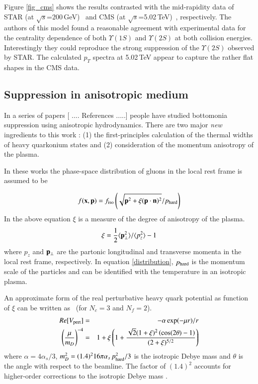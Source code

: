 {{Figure \ref{fig_cms} shows the results contrasted with the mid-rapidity data of STAR (at
$\sqrt{s}$=200\,GeV)~\cite{Ye:2017qmstar} and CMS
(at $\sqrt{s}$=5.02\,TeV)~\cite{Flores:2017qmcms}, respectively. 
The authors of this model found a reasonable agreement  with experimental data for the centrality dependence of both $\Upsilon(1S)$ and $\Upsilon(2S)$ at both collision energies. Interestingly they could reproduce the strong suppression of
 the $\Upsilon(2S)$ observed by STAR.  
The calculated $p_T$ spectra at 5.02\,TeV appear to capture the rather flat shapes in the CMS data. 



\subsection{Suppression in anisotropic medium}


In a series of papers [ .... References .....]
people have studied bottomonia suppression using anisotropic hydrodynamics. 
There are two major {\it new} ingredients to this work : (1) the first-principles calculation of the thermal widths of heavy quarkonium states 
and (2) consideration of the momentum anisotropy of the plasma. 

In these works the phase-space distribution of gluons in the local rest frame is assumed to be 

\begin{equation} 
f({\bf x},{\bf p}) = f_{\rm iso}\left(\sqrt{{\bf p}^2+ \xi({\bf p}\cdot{\bf n})^2 }  / 
p_{\rm hard} \right) 
\label{distribution}
\end{equation} 
In the above equation $\xi$ is a measure of the degree of anisotropy of the plasma.
\begin{equation}
\xi = \frac{1}{2} \langle 
{\bf p}_\perp^2\rangle/\langle p_z^2\rangle -1
\end{equation} 
where $p_z$ and 
${\bf p}_\perp $ are the partonic longitudinal and transverse momenta in the local
rest frame, respectively. In equation \ref{distribution}, $p_{\rm hard}$ is the momentum  
scale of the particles and can be identified with the temperature
in an isotropic plasma. 

An approximate form of the real perturbative heavy quark potential as function of $\xi$ can be 
written as~\cite{Dumitru:2007hy} (for $N_c=3$ and $N_f=2$). 
\begin{eqnarray}
Re[V_{\rm pert}] &=& - \alpha \exp(-\mu r)/r \nonumber \\
\left(\frac{\mu}{m_D}\right)^{-4} &=&  
1 + \xi\left(1 + \frac{\sqrt{2}(1+\xi)^2\left(\cos(2\theta) - 1 \right)}{(2+ \xi)^{5/2}} \right) 
\label{eq:muparam}
\end{eqnarray}
where $\alpha = 4\alpha_s/3$, $m_D^2 = (1.4)^2 16 \pi \alpha_s  \, p_{\rm hard}^2/3$ is the isotropic
Debye mass and $\theta$ is the angle with respect to the beamline.  
The factor of $(1.4)^2$ accounts for higher-order corrections to the isotropic Debye 
mass \cite{Kaczmarek:2004gv}.

}}
